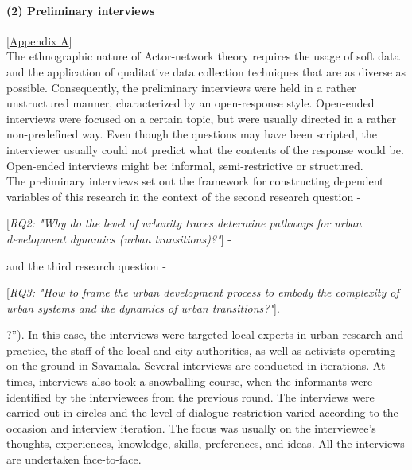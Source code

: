 \documentclass[11pt]{report}
\begin{document}
\paragraph{(2) Preliminary interviews} 
[\href{ref}{Appendix A}]
\\
The ethnographic nature of Actor-network theory requires the usage of soft data and the application of qualitative data collection techniques that are as diverse as possible. Consequently, the preliminary interviews were held in a rather unstructured manner, characterized by an open-response style. Open-ended interviews were focused on a certain topic, but were usually directed in a rather non-predefined way.  Even though the questions may have been scripted, the interviewer usually could not predict what the contents of the response would be. Open-ended interviews might be: informal, semi-restrictive or structured.
\\

The preliminary interviews set out the framework for constructing dependent variables of this research in the context of the second research question -

[\textit{RQ2: "Why do the level of urbanity traces determine pathways for urban development dynamics (urban transitions)?"}] -

and the third research question -

[\textit{RQ3: "How to frame the  urban development process to embody the complexity of urban systems and the dynamics of urban transitions?"}].

?”). In this case, the interviews were targeted local experts in urban research and practice, the staff of the local and city authorities, as well as activists operating on the ground in Savamala. Several interviews are conducted in iterations. At times, interviews also took a snowballing course, when the informants were identified by the interviewees from the previous round. The interviews were carried out in circles and the level of dialogue restriction varied according to the occasion and interview iteration. The focus was usually on the interviewee’s thoughts, experiences, knowledge, skills, preferences, and ideas. All the interviews are undertaken face-to-face.
\\
\end{document}
